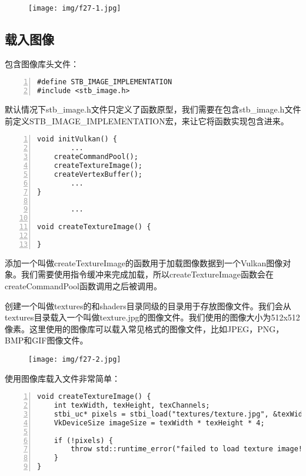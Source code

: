 \documentclass{ctexart}
\begin{document}
\begin{figure}[H]
	\centering
	\texttt{[image: img/f27-1.jpg]}
\end{figure}

\subsection{载入图像}

包含图像库头文件：

\begin{lstlisting}[language={[ANSI]C},keywordstyle=\color{blue!70},commentstyle=\color{red!50!green!50!blue!50},frame=shadowbox, rulesepcolor=\color{red!20!green!20!blue!20},basicstyle=\small,numbers=left, numberstyle=\tiny,breaklines=true]
#define STB_IMAGE_IMPLEMENTATION
#include <stb_image.h>
\end{lstlisting}

默认情况下stb\_image.h文件只定义了函数原型，我们需要在包含stb\_image.h文件前定义STB\_IMAGE\_IMPLEMENTATION宏，来让它将函数实现包含进来。

\begin{lstlisting}[language={[ANSI]C},keywordstyle=\color{blue!70},commentstyle=\color{red!50!green!50!blue!50},frame=shadowbox, rulesepcolor=\color{red!20!green!20!blue!20},basicstyle=\small,numbers=left, numberstyle=\tiny,breaklines=true]
void initVulkan() {
		...
	createCommandPool();
	createTextureImage();
	createVertexBuffer();
		...
}

		...

void createTextureImage() {

}
\end{lstlisting}

添加一个叫做createTextureImage的函数用于加载图像数据到一个Vulkan图像对象。我们需要使用指令缓冲来完成加载，所以createTextureImage函数会在createCommandPool函数调用之后被调用。

创建一个叫做textures的和shaders目录同级的目录用于存放图像文件。我们会从textures目录载入一个叫做texture.jpg的图像文件。我们使用的图像大小为512x512像素。这里使用的图像库可以载入常见格式的图像文件，比如JPEG，PNG，BMP和GIF图像文件。

\begin{figure}[H]
	\centering
	\texttt{[image: img/f27-2.jpg]}
\end{figure}

使用图像库载入文件非常简单：

\begin{lstlisting}[language={[ANSI]C},keywordstyle=\color{blue!70},commentstyle=\color{red!50!green!50!blue!50},frame=shadowbox, rulesepcolor=\color{red!20!green!20!blue!20},basicstyle=\small,numbers=left, numberstyle=\tiny,breaklines=true]
void createTextureImage() {
	int texWidth, texHeight, texChannels;
	stbi_uc* pixels = stbi_load("textures/texture.jpg", &texWidth, &texHeight, &texChannels, STBI_rgb_alpha);
	VkDeviceSize imageSize = texWidth * texHeight * 4;

	if (!pixels) {
		throw std::runtime_error("failed to load texture image!");
	}
}
\end{lstlisting}
\end{document}

